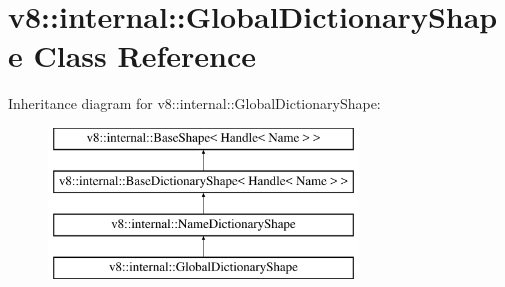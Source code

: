 \hypertarget{classv8_1_1internal_1_1GlobalDictionaryShape}{}\section{v8\+:\+:internal\+:\+:Global\+Dictionary\+Shape Class Reference}
\label{classv8_1_1internal_1_1GlobalDictionaryShape}
Inheritance diagram for v8\+:\+:internal\+:\+:Global\+Dictionary\+Shape\+:\begin{figure}[H]
\begin{center}
\leavevmode
\includegraphics[height=4.000000cm]{classv8_1_1internal_1_1GlobalDictionaryShape}
\end{center}
\end{figure}
